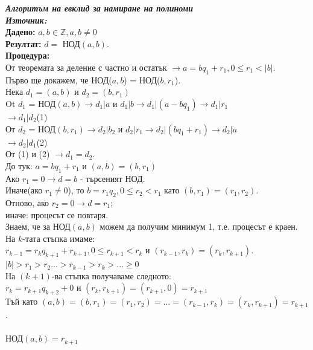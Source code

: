 \documentclass[11pt]{article} %
\newcommand{\italicBold}[1]{\textbf{\emph{#1}}}
\newcommand{\source}{\italicBold{Източник: }}
\begin{document}
\italicBold{Алгоритъм на евклид за намиране на полиноми}\\
\source {}\\
\textbf{Дадено: } $a, b \in \mathbb{Z}, a,b \neq 0$\\
\textbf{Резултат: } $d=$ НОД$(a,b)$.\\
\textbf{Процедура: }\\
От теоремата за деление с частно и остатък $\rightarrow a=bq_{1}+r_{1}, 0 \leq r_{1} < |b|$.\\
Първо ще докажем, че НОД($a, b$) = НОД($b, r_{1}$).\\
Нека $d_{1}=(a,b)$ и $d_{2}=(b, r_{1})$\\
Ot $d_{1}$ = НОД$(a,b) \rightarrow d_{1}|a$ и $d_{1}|b \rightarrow d_{1}|(a-bq_{1})\rightarrow d_{1}|r_{1}$\\
$\rightarrow d_{1}|d_{2}$(1)\\
От $d_{2}$ = НОД$(b, r_{1}) \rightarrow d_{2}|b_{2}$ и $d_{2}|r_{1} \rightarrow d_{2}|(bq_{1}+r_{1})\rightarrow d_{2}|a$\\
$\rightarrow d_{2}|d_{1}$(2)\\
От (1) и (2) $\rightarrow d_{1} = d_{2}$.\\
До тук: $a = bq_{1} + r_{1}$ и $(a,b) = (b, r_{1})$\\
Ако $r_{1} = 0 \rightarrow d= b$ - търсеният НОД.\\
Иначе(ако $r_{1}\neq 0$), то $b = r_{1}q_{2}, 0 \leq r_{2}<r_{1}$ като $(b, r_{1}) = (r_{1}, r_{2})$.\\
Отново, ако $r_{2} = 0 \rightarrow d = r_{1}$;\\
иначе: процесът се повтаря.\\
Знаем, че за НОД$(a,b)$ можем да получим минимум 1, т.е. процесът е краен.\\
На $k$-тата стъпка имаме:\\
$r_{k-1}=r_{k}q_{k+1}+r_{k+1},0 \leq r_{k+1} < r_{k}$ и $(r_{k-1}, r_{k}) = (r_{k}, r_{k+1})$.\\
$|b|>r_{1}>r_{2}...>r_{k-1}>r_{k}>...\geq 0$\\
На $(k+1)$-ва стъпка получаваме следното:\\
$r_{k} = r_{k+1}q_{k+2}+0$ и $(r_{k}, r_{k+1})=(r_{k+1},0)=r_{k+1}$\\
Тъй като $(a,b)=(b,r_{1})=(r_{1}, r_{2})=...=(r_{k-1}, r_{k})=(r_{k},r_{k+1})=r_{k+1}$.\\\\
\noindent НОД$(a,b)=r_{k+1}$ \\
\end{document}
